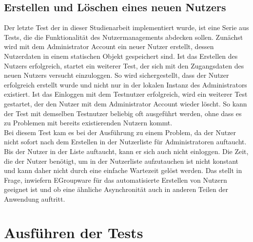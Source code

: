 \subsection{Erstellen und Löschen eines neuen Nutzers}

Der letzte Test der in dieser Studienarbeit implementiert wurde, ist eine Serie aus Tests, die die Funktionalität des Nutzermanagements abdecken sollen.
Zunächst wird mit dem Administrator Account ein neuer Nutzer erstellt, dessen Nutzerdaten in einem statischen Objekt gespeichert sind.
Ist das Erstellen des Nutzers erfolgreich, startet ein weiterer Test, der sich mit den Zugangsdaten des neuen Nutzers versucht einzuloggen.
So wird sichergestellt, dass der Nutzer erfolgreich erstellt wurde und nicht nur in der lokalen Instanz des Administrators existiert.
Ist das Einloggen mit dem Testnutzer erfolgreich, wird ein weiterer Test gestartet, der den Nutzer mit dem Administrator Account wieder löscht.
So kann der Test mit demselben Testnutzer beliebig oft ausgeführt werden, ohne dass es zu Problemen mit bereits existierenden Nutzern kommt.
\\
Bei diesem Test kam es bei der Ausführung zu einem Problem, da der Nutzer nicht sofort nach dem Erstellen in der Nutzerliste für Administratoren auftaucht.
Bis der Nutzer in der Liste auftaucht, kann er sich auch nicht einloggen.
Die Zeit, die der Nutzer benötigt, um in der Nutzerliste aufzutauchen ist nicht konstant und kann daher nicht durch eine einfache Wartezeit gelöst werden.
Das stellt in Frage, inwiefern EGroupware für das automatisierte Erstellen von Nutzern geeignet ist und ob eine ähnliche Asynchronität auch in anderen Teilen der Anwendung auftritt.


\section{Ausführen der Tests}
